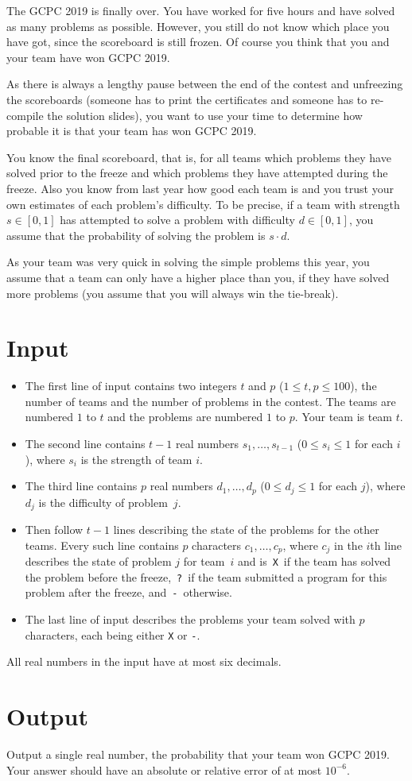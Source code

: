 The GCPC 2019 is finally over.
You have worked for five hours and have solved as many problems as possible.
However, you still do not know which place you have got, since the scoreboard is still frozen.
Of course you think that you and your team have won GCPC 2019.


As there is always a lengthy pause between the end of the contest and unfreezing the scoreboards (someone has to print the certificates and someone has to re-compile the solution slides), you want to use your time to determine how probable it is that your team has won GCPC 2019.

You know the final scoreboard, that is, for all teams which problems they have solved prior to the freeze and which problems they have attempted during the freeze.
Also you know from last year how good each team is and you trust your own estimates of each problem's difficulty.
To be precise, if a team with strength $s \in [0,1]$ has attempted to solve a problem with difficulty $d \in [0,1]$, you assume that the probability of solving the problem is $s\cdot d$.

As your team was very quick in solving the simple problems this year, you assume that a team can only have a higher place than you, if they have solved more problems (you assume that you will always win the tie-break).


\section*{Input}
\begin{itemize}
	\item The first line of input contains two integers $t$ and $p$ ($1\leq t,p \leq 100$), the number of teams and the number of problems in the contest. The teams are numbered $1$ to $t$ and the problems are numbered $1$ to $p$. Your team is team $t$.
	\item The second line contains $t-1$ real numbers $s_1, \ldots, s_{t-1}$ ($0 \leq s_i \leq 1$ for each $i$), where $s_i$ is the strength of team $i$.
	\item The third line contains $p$ real numbers $d_1, \ldots, d_p$ ($0 \leq d_j \leq 1$ for each $j$), where $d_j$ is the difficulty of problem~$j$.
	\item Then follow $t-1$ lines describing the state of the problems for the other teams.
    Every such line contains $p$ characters $c_1, \ldots, c_p$, where $c_j$ in the $i$th line describes the state of problem $j$ for team~$i$ and is~\texttt{X}~if
    the team has solved the problem before the freeze,~\texttt{?}~if the team submitted a program for this problem after the freeze, and~\texttt{-}~otherwise.
	\item The last line of input describes the problems your team solved with $p$ characters, each being either \texttt{X} or \texttt{-}.
\end{itemize}

All real numbers in the input have at most six decimals. 


\section*{Output}
Output a single real number, the probability that your team won GCPC 2019. Your answer should have an absolute or relative error of at most $10^{-6}$.
